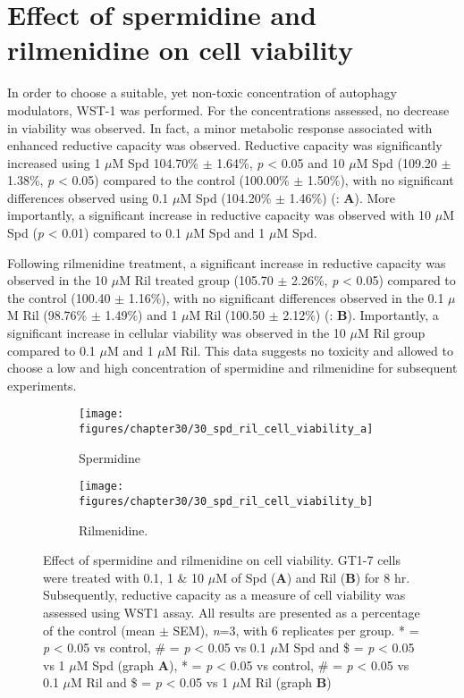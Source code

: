 {\section{Effect of spermidine and rilmenidine on cell viability}
In order to choose a suitable, yet non-toxic concentration of autophagy modulators, WST-1 was performed. For the concentrations assessed, no decrease in viability was observed. In fact, a minor metabolic response associated with enhanced reductive capacity was observed. Reductive capacity was significantly increased using 1 $\mu$M Spd 104.70\% $\pm$ 1.64\%, \textit{p} < 0.05 and 10 $\mu$M Spd (109.20 $\pm$ 1.38\%, \textit{p} < 0.05) compared to the control (100.00\% $\pm$ 1.50\%), with no significant differences observed using 0.1 $\mu$M Spd (104.20\% $\pm$ 1.46\%) (: \textbf{A}). More importantly, a significant increase in reductive capacity was observed with 10 $\mu$M Spd (\textit{p} < 0.01) compared to 0.1 $\mu$M Spd and 1 $\mu$M Spd.

Following rilmenidine treatment, a significant increase in reductive capacity was observed in the 10 $\mu$M Ril treated group (105.70 $\pm$ 2.26\%, \textit{p} < 0.05) compared to the control (100.40 $\pm$ 1.16\%), with no significant differences observed in the 0.1 $\mu$M Ril (98.76\% $\pm$ 1.49\%) and 1 $\mu$M Ril (100.50 $\pm$ 2.12\%) (: \textbf{B}). Importantly, a significant increase in cellular viability was observed in the 10 $\mu$M Ril group compared to 0.1 $\mu$M and 1 $\mu$M Ril. This data suggests no toxicity and allowed to choose a low and high concentration of spermidine and rilmenidine for subsequent experiments.

\begin{figure}[!htbp]
  \centering
  \begin{subfigure}[b]{0.495\linewidth}
    \texttt{[image: figures/chapter30/30\_spd\_ril\_cell\_viability\_a]}
    \caption{Spermidine}
  \end{subfigure}
  \begin{subfigure}[b]{0.495\linewidth}
    \texttt{[image: figures/chapter30/30\_spd\_ril\_cell\_viability\_b]}
    \caption{Rilmenidine.}
  \end{subfigure}
  \caption[Effect of spermidine and rilmenidine on cell viability]{Effect of spermidine and rilmenidine on cell viability. GT1-7 cells were treated with 0.1, 1 \& 10 $\mu$M of Spd (\textbf{A}) and Ril (\textbf{B}) for 8 hr. Subsequently, reductive capacity as a measure of cell viability was assessed using WST1 assay. All results are presented as a percentage of the control (mean $\pm$ SEM), \textit{n}=3, with 6 replicates per group. * = \textit{p} < 0.05 vs control, \# = \textit{p} < 0.05 vs 0.1 $\mu$M Spd and \$ = \textit{p} < 0.05 vs 1 $\mu$M Spd (graph \textbf{A}), * = \textit{p} < 0.05 vs control, \# = \textit{p} < 0.05 vs 0.1 $\mu$M Ril and \$ = \textit{p} < 0.05 vs 1 $\mu$M Ril (graph \textbf{B})}
  \label{fig:30_spd_cell_viability}
\end{figure}

}
